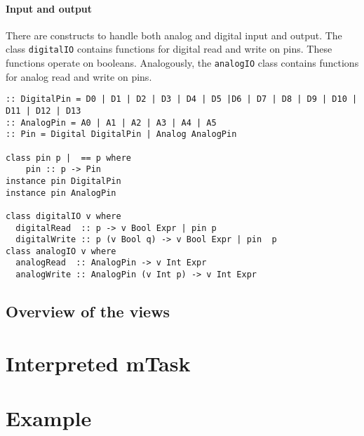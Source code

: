 \paragraph{Input and output} There are constructs to handle both analog and digital input and output. The class \texttt{digitalIO} contains
functions for digital read and write on pins. These functions operate on booleans. Analogously, the \texttt{analogIO} class contains functions for analog read and write on pins.

\begin{lstlisting}[caption=mTask I/O classes,captionpos=b,label=mtask_io]
:: DigitalPin = D0 | D1 | D2 | D3 | D4 | D5 |D6 | D7 | D8 | D9 | D10 | D11 | D12 | D13
:: AnalogPin = A0 | A1 | A2 | A3 | A4 | A5
:: Pin = Digital DigitalPin | Analog AnalogPin

class pin p |  == p where
	pin :: p -> Pin
instance pin DigitalPin
instance pin AnalogPin

class digitalIO v where
  digitalRead  :: p -> v Bool Expr | pin p
  digitalWrite :: p (v Bool q) -> v Bool Expr | pin  p
class analogIO v where
  analogRead  :: AnalogPin -> v Int Expr 
  analogWrite :: AnalogPin (v Int p) -> v Int Expr
\end{lstlisting}


\subsection{Overview of the views}


\section{Interpreted mTask}

\section{Example}

